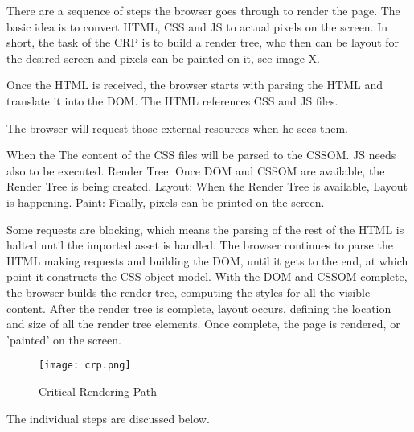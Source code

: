There are a sequence of steps the browser goes through to render the page.
The basic idea is to convert HTML, CSS and JS to actual pixels on the screen.
In short, the task of the CRP is to build a render tree, who then can be layout for the desired screen and pixels can be painted on it, see image X.

Once the HTML is received, the browser starts with parsing the HTML and translate it into the DOM.
The HTML references CSS and JS files.

The browser will request those external resources when he sees them.


When the The content of the CSS files will be parsed to the CSSOM.
JS needs also to be executed.
Render Tree: Once DOM and CSSOM are available, the Render Tree is being created.
Layout: When the Render Tree is available, Layout is happening.
Paint: Finally, pixels can be printed on the screen.



Some requests are blocking, which means the parsing of the rest of the HTML is halted until the imported asset is handled. The browser continues to parse the HTML making requests and building the DOM, until it gets to the end, at which point it constructs the CSS object model. With the DOM and CSSOM complete, the browser builds the render tree, computing the styles for all the visible content. After the render tree is complete, layout occurs, defining the location and size of all the render tree elements. Once complete, the page is rendered, or 'painted' on the screen.



\begin{figure}[h!]
\begin{center}
\texttt{[image: crp.png]}
\caption{Critical Rendering Path}
\label{img:crp}
\end{center}
\end{figure}

The individual steps are discussed below.






